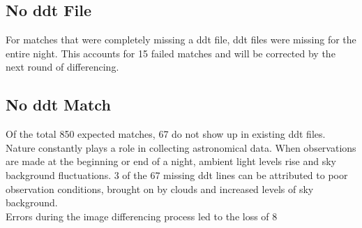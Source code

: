 \subsection{No ddt File}
\indent For matches that were completely missing a ddt file, ddt files were missing 
for the entire night. This accounts for 15 failed matches and will be corrected by 
the next round of differencing.

\subsection{No ddt Match}\label{sec:noddtline}
%
%
\indent Of the total 850 expected matches, 67 do not show up in existing ddt files.  
%
Nature constantly plays a role in collecting astronomical data. When 
observations are made at the beginning or end of a night, ambient light 
levels rise and sky background fluctuations. 3 of the 67 missing ddt 
lines can be attributed to poor observation conditions, brought on by 
clouds and increased levels of sky background.\\
%
%
\indent Errors during the image differencing process led to the loss of 8 
